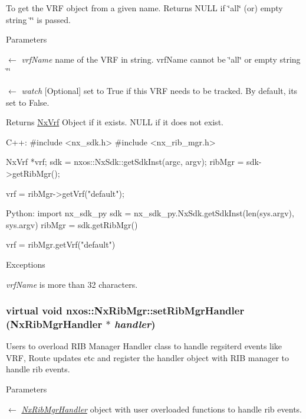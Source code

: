 \label{classnxos_1_1NxRibMgr_a605323f1d764bc8c27fe770a9a6b4628}
To get the VRF object from a given name. Returns NULL if \char`\"{}all\char`\"{} (or) empty string \char`\"{}\char`\"{} is passed. 
\begin{DoxyParams}{Parameters}
\item[\mbox{$\leftarrow$} {\em vrfName}]name of the VRF in string. vrfName cannot be \char`\"{}all\char`\"{} or empty string \char`\"{}\char`\"{} \item[\mbox{$\leftarrow$} {\em watch}]\mbox{[}Optional\mbox{]} set to True if this VRF needs to be tracked. By default, its set to False. \end{DoxyParams}
\begin{DoxyReturn}{Returns}
\hyperlink{classnxos_1_1NxVrf}{NxVrf} Object if it exists. NULL if it does not exist.
\end{DoxyReturn}

\begin{DoxyCode}
  C++:
       #include <nx_sdk.h>
       #include <nx_rib_mgr.h>

       NxVrf *vrf;
       sdk = nxos::NxSdk::getSdkInst(argc, argv);
       ribMgr = sdk->getRibMgr();

       vrf = ribMgr->getVrf("default");

  Python:
       import nx_sdk_py
       sdk = nx_sdk_py.NxSdk.getSdkInst(len(sys.argv), sys.argv)
       ribMgr = sdk.getRibMgr()

       vrf = ribMgr.getVrf("default")
\end{DoxyCode}
 
\begin{DoxyExceptions}{Exceptions}
\item[{\em vrfName}]is more than 32 characters. \end{DoxyExceptions}
\hypertarget{classnxos_1_1NxRibMgr_ac42dd29e34f9c508614733dbec518b99}{
\subsubsection[{setRibMgrHandler}]{\setlength{\rightskip}{0pt plus 5cm}virtual void nxos::NxRibMgr::setRibMgrHandler ({\bf NxRibMgrHandler} $\ast$ {\em handler})}}
\label{classnxos_1_1NxRibMgr_ac42dd29e34f9c508614733dbec518b99}
Users to overload RIB Manager Handler class to handle regsiterd events like VRF, Route updates etc and register the handler object with RIB manager to handle rib events. 
\begin{DoxyParams}{Parameters}
\item[\mbox{$\leftarrow$} {\em \hyperlink{classnxos_1_1NxRibMgrHandler}{NxRibMgrHandler}}]object with user overloaded functions to handle rib events.\end{DoxyParams}

